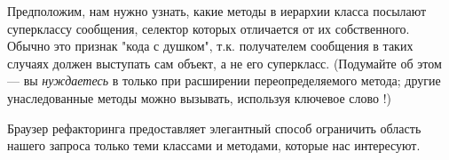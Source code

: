 \documentclass[a4paper,10pt,twoside]{book}
\begin{document}
Предположим, нам нужно узнать, какие методы в иерархии класса  посылают суперклассу сообщения, селектор которых отличается от их собственного.
Обычно это признак "кода с душком", т.к. получателем сообщения в таких случаях должен выступать сам объект, а не его суперкласс. (Подумайте об этом --- вы \emph{нуждаетесь} в \super только при расширении переопределяемого метода; другие унаследованные методы можно вызывать, используя ключевое слово \self!)

Браузер рефакторинга предоставляет элегантный способ ограничить область нашего запроса только теми классами и методами, которые нас интересуют.

\dothis{Откройте браузер на классе \ct{Collection}.
\actclick на имени класса и выберете \menu{refactoring scope>subclasses with}.
Откроется новое окно браузера с окружением, ограниченным иерархией класса \ct{Collection}.
Внутри этой ограниченной области выберете \menu{refactoring scope>super-sends}, чтобы открыть новое окружение со всеми методами внутри иерархии класса \ct{Collectuon}, посылающими сообщения суперклассу.
Теперь \click на любом методе и выберете \menu{refactor>code critics}.
Затем перейдите к \menu{Lint checks>Possible bugs>Sends different super message} и \actclick, чтобы выбрать \menu{browse}.}
\end{document}
